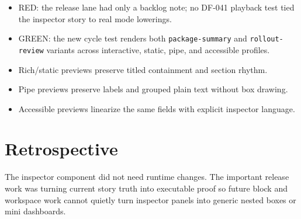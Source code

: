 \begin{itemize}
\tightlist
\item
  RED: the release lane had only a backlog note; no DF-041 playback test tied the inspector story to real mode lowerings.
\item
  GREEN: the new cycle test renders both \texttt{p\allowbreak{}a\allowbreak{}c\allowbreak{}k\allowbreak{}a\allowbreak{}g\allowbreak{}e\allowbreak{}-\allowbreak{}s\allowbreak{}u\allowbreak{}m\allowbreak{}m\allowbreak{}a\allowbreak{}r\allowbreak{}y} and \texttt{r\allowbreak{}o\allowbreak{}l\allowbreak{}l\allowbreak{}o\allowbreak{}u\allowbreak{}t\allowbreak{}-\allowbreak{}r\allowbreak{}e\allowbreak{}v\allowbreak{}i\allowbreak{}e\allowbreak{}w} variants across interactive, static, pipe, and accessible profiles.
\item
  Rich/static previews preserve titled containment and section rhythm.
\item
  Pipe previews preserve labels and grouped plain text without box drawing.
\item
  Accessible previews linearize the same fields with explicit inspector language.
\end{itemize}

\section{Retrospective}\label{record-095-retrospective}

The inspector component did not need runtime changes. The important release work was turning current story truth into executable proof so future block and workspace work cannot quietly turn inspector panels into generic nested boxes or mini dashboards.

